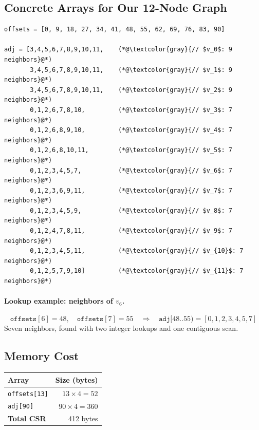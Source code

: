 \documentclass[11pt,letterpaper]{article}
\begin{document}
\subsection{Concrete Arrays for Our 12-Node Graph}

\begin{lstlisting}[numbers=none, caption={CSR arrays for test6\_12nodes}]
offsets = [0, 9, 18, 27, 34, 41, 48, 55, 62, 69, 76, 83, 90]

adj = [3,4,5,6,7,8,9,10,11,    (*@\textcolor{gray}{// $v_0$: 9 neighbors}@*)
       3,4,5,6,7,8,9,10,11,    (*@\textcolor{gray}{// $v_1$: 9 neighbors}@*)
       3,4,5,6,7,8,9,10,11,    (*@\textcolor{gray}{// $v_2$: 9 neighbors}@*)
       0,1,2,6,7,8,10,         (*@\textcolor{gray}{// $v_3$: 7 neighbors}@*)
       0,1,2,6,8,9,10,         (*@\textcolor{gray}{// $v_4$: 7 neighbors}@*)
       0,1,2,6,8,10,11,        (*@\textcolor{gray}{// $v_5$: 7 neighbors}@*)
       0,1,2,3,4,5,7,          (*@\textcolor{gray}{// $v_6$: 7 neighbors}@*)
       0,1,2,3,6,9,11,         (*@\textcolor{gray}{// $v_7$: 7 neighbors}@*)
       0,1,2,3,4,5,9,          (*@\textcolor{gray}{// $v_8$: 7 neighbors}@*)
       0,1,2,4,7,8,11,         (*@\textcolor{gray}{// $v_9$: 7 neighbors}@*)
       0,1,2,3,4,5,11,         (*@\textcolor{gray}{// $v_{10}$: 7 neighbors}@*)
       0,1,2,5,7,9,10]         (*@\textcolor{gray}{// $v_{11}$: 7 neighbors}@*)
\end{lstlisting}

\paragraph{Lookup example: neighbors of $v_6$.}
\[
  \texttt{offsets}[6] = 48, \quad \texttt{offsets}[7] = 55 \quad\Longrightarrow\quad \texttt{adj}[48..55) = [0,1,2,3,4,5,7]
\]
Seven neighbors, found with two integer lookups and one contiguous scan.

\subsection{Memory Cost}

\begin{center}
\begin{tabular}{lr}
\toprule
\textbf{Array} & \textbf{Size (bytes)} \\
\midrule
\texttt{offsets[13]} & $13 \times 4 = 52$ \\
\texttt{adj[90]}    & $90 \times 4 = 360$ \\
\midrule
\textbf{Total CSR} & 412 bytes \\
\bottomrule
\end{tabular}
\end{center}
\end{document}
